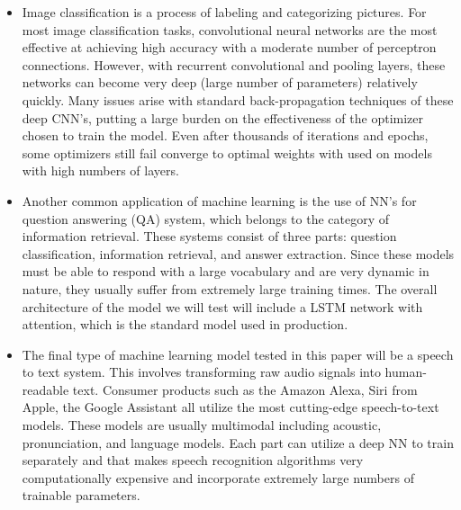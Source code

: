 \begin{itemize}
    \item Image classification is a process of labeling and categorizing pictures. For most image classification tasks, convolutional neural networks are the most effective at achieving high accuracy with a moderate number of perceptron connections. However, with recurrent convolutional and pooling layers, these networks can become very deep (large number of parameters) relatively quickly\cite{CNN}. Many issues arise with standard back-propagation techniques of these deep CNN's, putting a large burden on the effectiveness of the optimizer chosen to train the model. Even after thousands of iterations and epochs, some optimizers still fail converge to optimal weights\cite{Sun2019OptimizationFD} with used on models with high numbers of layers. 
    
    \item Another common application of machine learning is the use of NN's for question answering (QA) system, which belongs to the category of information retrieval. These systems consist of three parts: question classification, information retrieval, and answer extraction. Since these models  must be able to respond with a large vocabulary and are very dynamic in nature, they usually suffer from extremely large training times. The overall architecture of the model we will test will include a LSTM network with attention, which is the standard model used in production. 
    
    \item The final type of machine learning model tested in this paper will be a speech to text system. This involves transforming raw audio signals into human-readable text. Consumer products such as the Amazon Alexa, Siri from Apple, the Google Assistant all utilize the most cutting-edge speech-to-text models. These models are usually multimodal including acoustic, pronunciation, and language models. Each part can utilize a deep NN to train separately and that makes speech recognition algorithms very computationally expensive and incorporate extremely large numbers of trainable parameters. 
    

\end{itemize}

